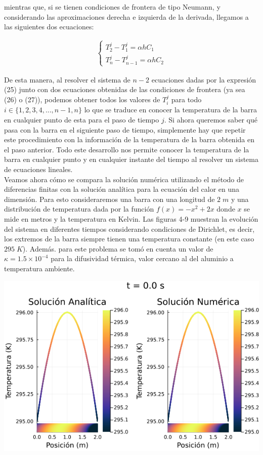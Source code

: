 \documentclass[12pt]{article}
\begin{document}
mientras que, si se tienen condiciones de frontera de tipo Neumann, y considerando las aproximaciones derecha e izquierda de la derivada, llegamos a las siguientes dos ecuaciones:

\begin{align}
    \begin{cases}
        T_2^j - T_1^j = \alpha hC_1\\
        T_n^j - T_{n-1}^j = \alpha hC_2
    \end{cases}
\end{align}

De esta manera, al resolver el sistema de $n-2$ ecuaciones dadas por la expresión (25) junto con dos ecuaciones obtenidas de las condiciones de frontera (ya sea (26) o (27)), podemos obtener todos los valores de $T_i^j$ para todo $i \in \{1,2,3,4,...,n-1,n\}$ lo que se traduce en conocer la temperatura de la barra en cualquier punto de esta para el paso de tiempo $j$. Si ahora queremos saber qué pasa con la barra en el siguiente paso de tiempo, simplemente hay que repetir este procedimiento con la información de la temperatura de la barra obtenida en el paso anterior. Todo este desarrollo nos permite conocer la temperatura de la barra en cualquier punto y en cualquier instante del tiempo al resolver un sistema de ecuaciones lineales. \\

Veamos ahora cómo se compara la solución numérica utilizando el método de diferencias finitas con la solución analítica para la ecuación del calor en una dimensión. Para esto consideraremos una barra con una longitud de $2 \; m$ y una distribución de temperatura dada por la función $f(x) = -x^2 + 2x$ donde $x$ se mide en metros y la temperatura en Kelvin. Las figuras 4-9 muestran la evolución del sistema en diferentes tiempos considerando condiciones de Dirichlet, es decir, los extremos de la barra siempre tienen una temperatura constante (en este caso $295 \; K$). Además. para este problema se tomó en cuenta un valor de $\kappa = 1.5 \times 10^{-4}$ para la difusividad térmica, valor cercano al del aluminio a temperatura ambiente. \\

\begin{center}
    \includegraphics[width=1\linewidth]{Ejemplo_01_t_0.png}
\end{center}
\end{document}
